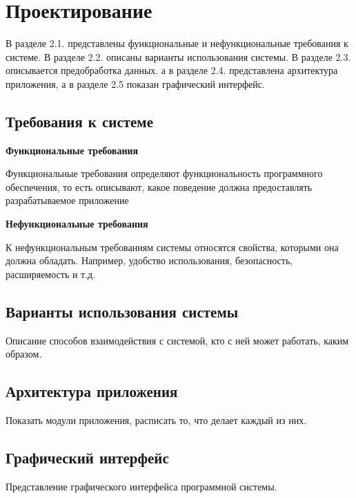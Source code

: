 \newpage
\section{Проектирование}
\label{sec:designing}
В разделе 2.1. представлены функциональные и нефункциональные требования к системе. В разделе 2.2. описаны варианты использования системы. В разделе 2.3. описывается предобработка данных. а в разделе 2.4. представлена архитектура приложения, а в разделе 2.5 показан графический интерфейс. 

\vspace{1.5em}
\subsection{Требования к системе}
\label{subsec:fotmalDefinition}
\textbf{Функциональные требования}

Функциональные требования определяют функциональность программного обеспечения, то есть описывают, какое поведение должна предоставлять разрабатываемое приложение

\textbf{Нефункциональные требования}

К нефункциональным требованиям системы относятся свойства, которыми она должна обладать. Например, удобство использования, безопасность, расширяемость и т.д.

\vspace{1.5em}
\subsection{Варианты использования системы}
\label{subsec:Variants}
Описание способов взаимодействия с системой, кто с ней может работать, каким образом.

\vspace{1.5em}
\subsection{Архитектура приложения}
\label{subsec:Architecture}
Показать модули приложения, расписать то, что делает каждый из них.

\vspace{1.5em}
\subsection{Графический интерфейс}
\label{subsec:Graphic}
Представление графического интерфейса программной системы.
